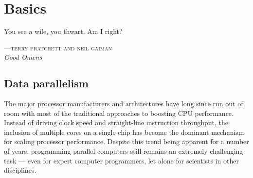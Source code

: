 %

\chapter{Basics}
\label{ch:basics}

\epigraph{You see a wile, you thwart. Am I right?}%
{\textsc{---terry pratchett and neil gaiman}\\\textit{Good Omens}}




\section{Data parallelism}
\label{sec:data_parallelism}

The major processor manufacturers and architectures have long since run out of
room with most of the traditional approaches to boosting CPU performance.
Instead of driving clock speed and straight-line instruction throughput,
the inclusion of multiple cores on a single chip has become the dominant
mechanism for scaling processor performance. Despite this trend being apparent
for a number of years, programming parallel computers still remains an extremely
challenging task --- even for expert computer programmers, let alone for
scientists in other disciplines.

